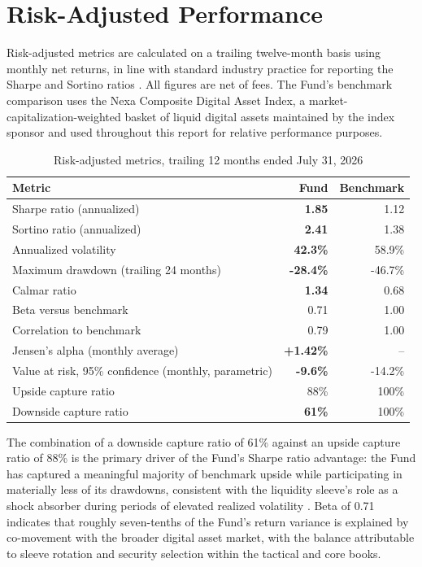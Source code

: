 \section{Risk-Adjusted Performance}

Risk-adjusted metrics are calculated on a trailing twelve-month basis using monthly net returns, in line with standard industry practice for reporting the Sharpe and Sortino ratios \citep{sharpe1966,sortino1994}. All figures are net of fees. The Fund's benchmark comparison uses the Nexa Composite Digital Asset Index, a market-capitalization-weighted basket of liquid digital assets maintained by the index sponsor and used throughout this report for relative performance purposes.

\begin{table}[H]
\centering
\small
\caption{Risk-adjusted metrics, trailing 12 months ended July 31, 2026}
\label{tab:risk-metrics}
\begin{tabular}{@{}lrr@{}}
\toprule
\textbf{Metric} & \textbf{Fund} & \textbf{Benchmark} \\
\midrule
Sharpe ratio (annualized) & \textbf{1.85} & 1.12 \\
Sortino ratio (annualized) & \textbf{2.41} & 1.38 \\
Annualized volatility & \textbf{42.3\%} & 58.9\% \\
Maximum drawdown (trailing 24 months) & \textbf{-28.4\%} & -46.7\% \\
Calmar ratio & \textbf{1.34} & 0.68 \\
Beta versus benchmark & 0.71 & 1.00 \\
Correlation to benchmark & 0.79 & 1.00 \\
Jensen's alpha (monthly average) & \textbf{+1.42\%} & -- \\
Value at risk, 95\% confidence (monthly, parametric) & \textbf{-9.6\%} & -14.2\% \\
Upside capture ratio & 88\% & 100\% \\
Downside capture ratio & \textbf{61\%} & 100\% \\
\bottomrule
\end{tabular}
\end{table}

The combination of a downside capture ratio of 61\% against an upside capture ratio of 88\% is the primary driver of the Fund's Sharpe ratio advantage: the Fund has captured a meaningful majority of benchmark upside while participating in materially less of its drawdowns, consistent with the liquidity sleeve's role as a shock absorber during periods of elevated realized volatility \citep{ang2014}. Beta of 0.71 indicates that roughly seven-tenths of the Fund's return variance is explained by co-movement with the broader digital asset market, with the balance attributable to sleeve rotation and security selection within the tactical and core books.

